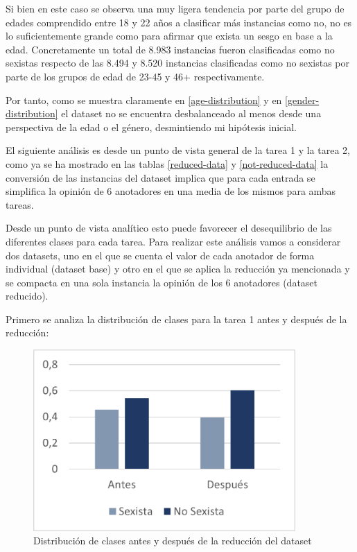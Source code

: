 Si bien en este caso se observa una muy ligera tendencia por parte del grupo de edades comprendido entre 18 y 22 años a clasificar más instancias como no, no es lo suficientemente grande como para afirmar que exista un sesgo en base a la edad. Concretamente un total de 8.983 instancias fueron clasificadas como no sexistas respecto de las 8.494 y 8.520 instancias clasificadas como no sexistas por parte de los grupos de edad de 23-45 y 46+ respectivamente.

Por tanto, como se muestra claramente en \autoref{age-distribution} y en \autoref{gender-distribution} el dataset no se encuentra desbalanceado al menos desde una perspectiva de la edad o el género, desmintiendo mi hipótesis inicial.

El siguiente análisis es desde un punto de vista general de la tarea 1 y la tarea 2, como ya se ha mostrado en las tablas \autoref{reduced-data} y \autoref{not-reduced-data} la conversión de las instancias del dataset implica que para cada entrada se simplifica la opinión de 6 anotadores en una media de los mismos para ambas tareas.

Desde un punto de vista analítico esto puede favorecer el desequilibrio de las diferentes clases para cada tarea. Para realizar este análisis vamos a considerar dos datasets, uno en el que se cuenta el valor de cada anotador de forma individual (dataset base) y otro en el que se aplica la reducción ya mencionada y se compacta en una sola instancia la opinión de los 6 anotadores (dataset reducido).

Primero se analiza la distribución de clases para la tarea 1 antes y después de la reducción:

\begin{figure}[H]
    \centering
   \includegraphics[width=10cm]{imagenes/Evaluacion/dataset_study/task1.png}
    \caption{\centering Distribución de clases antes y después de la reducción del dataset}
    \label{data-distribution-reducing}
\end{figure}

